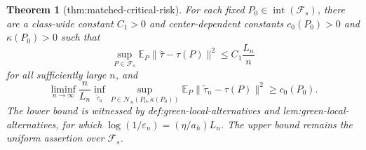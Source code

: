 \documentclass{article}
\newtheorem{theorem}{Theorem}
\begin{document}
\begin{theorem}[thm:matched-critical-risk]\label{thm:matched-critical-risk}
For each fixed \(P_0\in\operatorname{int}(\mathcal F_s)\), there are a class-wide constant \(C_1>0\) and center-dependent constants \(c_0(P_0)>0\) and \(\kappa(P_0)>0\) such that
\[
\sup_{P\in\mathcal F_s}\mathbb E_P\lVert\widehat\tau-\tau(P)\rVert^2
\leq C_1\frac{L_n}{n}
\]
for all sufficiently large \(n\), and
\[
\liminf_{n\to\infty}\frac{n}{L_n}
\inf_{\widetilde\tau_n}\sup_{P\in\mathcal N_n(P_0,\kappa(P_0))}
\mathbb E_P\lVert\widetilde\tau_n-\tau(P)\rVert^2
\geq c_0(P_0).
\]
The lower bound is witnessed by def:green-local-alternatives and lem:green-local-alternatives, for which \(\log(1/\varepsilon_n)=(\eta/a_h)L_n\).  The upper bound remains the uniform assertion over \(\mathcal F_s\).
\end{theorem}
\end{document}
